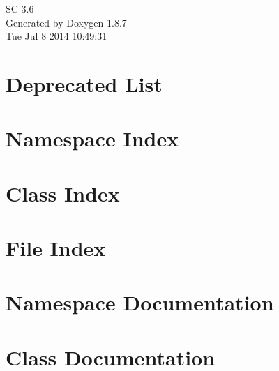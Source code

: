 \documentclass[twoside]{book}
\newcommand{\+}{\discretionary{\mbox{\scriptsize$\hookleftarrow$}}{}{}}
\newcommand{\clearemptydoublepage}{%
  \newpage{\pagestyle{empty}\cleardoublepage}%
}
\begin{document}
\hypersetup{pageanchor=false,
             bookmarks=true,
             bookmarksnumbered=true,
             pdfencoding=unicode
            }
\begin{titlepage}
\vspace*{7cm}
\begin{center}%
{\Large S\+C 3.6 }\\
\vspace*{1cm}
{\large Generated by Doxygen 1.8.7}\\
\vspace*{0.5cm}
{\small Tue Jul 8 2014 10:49:31}\\
\end{center}
\end{titlepage}
\clearemptydoublepage
\tableofcontents
\clearemptydoublepage
{}
\hypersetup{pageanchor=true}

\chapter{Deprecated List}
\label{deprecated}
\hypertarget{deprecated}{}

\chapter{Namespace Index}

\chapter{Class Index}

\chapter{File Index}

\chapter{Namespace Documentation}

\chapter{Class Documentation}
























\end{document}
